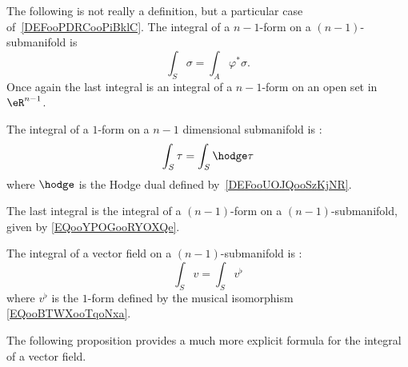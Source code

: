 The following is not really a definition, but a particular case of~\ref{DEFooPDRCooPiBklC}. The integral of a \( n-1\)-form on a \( (n-1)\)-submanifold is
\begin{equation}        \label{EQooYPOGooRYOXQe}
	\int_S\sigma=\int_A\varphi^*\sigma.
\end{equation}
Once again the last integral is an integral of a \( n-1\)-form on an open set in \( \eR^{n-1}\).

\begin{definition}       \label{DEFooAXFXooWiMLKP}
	The integral of a \( 1\)-form on a \( n-1\) dimensional submanifold is :
	\begin{equation}
		\int_S\tau=\int_S\hodge\tau
	\end{equation}
	where \( \hodge\) is the Hodge dual defined by~\ref{DEFooUOJQooSzKjNR}.
\end{definition}
The last integral is the integral of a \( (n-1)\)-form on a \( (n-1)\)-submanifold, given by \eqref{EQooYPOGooRYOXQe}.

\begin{definition}      \label{DEFooAXZGooJairMQ}
	The integral of a vector field on a \( (n-1)\)-submanifold is :
	\begin{equation}
		\int_Sv=\int_Sv^{\flat}
	\end{equation}
	where \( v^{\flat}\) is the \( 1\)-form defined by the musical isomorphism \eqref{EQooBTWXooTqoNxa}.
\end{definition}

The following proposition provides a much more explicit formula for the integral of a vector field.

